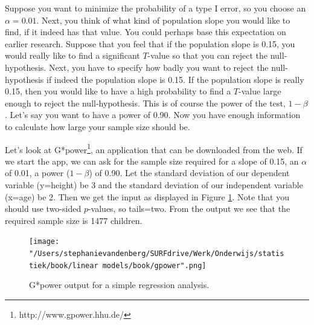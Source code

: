 \documentclass[]{book}\usepackage[]{graphicx}\usepackage[]{color}
\begin{document}
Suppose you want to minimize the probability of a type I error, so you choose an $\alpha=0.01$. Next, you think of what kind of population slope you would like to find, if it indeed has that value. You could perhaps base this expectation on earlier research. Suppose that you feel that if the population slope is 0.15, you would really like to find a significant $T$-value so that you can reject the null-hypothesis. Next, you have to specify how badly you want to reject the null-hypothesis if indeed the population slope is 0.15. If the population slope is really 0.15, then you would like to have a high probability to find a $T$-value large enough to reject the null-hypothesis. This is of course the power of the test, $1-\beta$. Let's say you want to have a power of 0.90. Now you have enough information to calculate how large your sample size should be.

Let's look at G*power\footnote{http://www.gpower.hhu.de/}, an application that can be downloaded from the web. If we start the app, we can ask for the sample size required for a slope of 0.15, an $\alpha$ of 0.01, a power ($1-\beta$) of 0.90. Let the standard deviation of our dependent variable (y=height) be 3 and the standard deviation of our independent variable (x=age) be 2. Then we get the input as displayed in Figure \ref{fig:gpower}. Note that you should use two-sided $p$-values, so tails=two. From the output we see that the required sample size is 1477 children.


\begin{figure}[h]
    \begin{center}
       \texttt{[image: "/Users/stephanievandenberg/SURFdrive/Werk/Onderwijs/statistiek/book/linear models/book/gpower".png]}
    \end{center}
    \caption{G*power output for a simple regression analysis.}
    \label{fig:gpower}
\end{figure}
\end{document}
